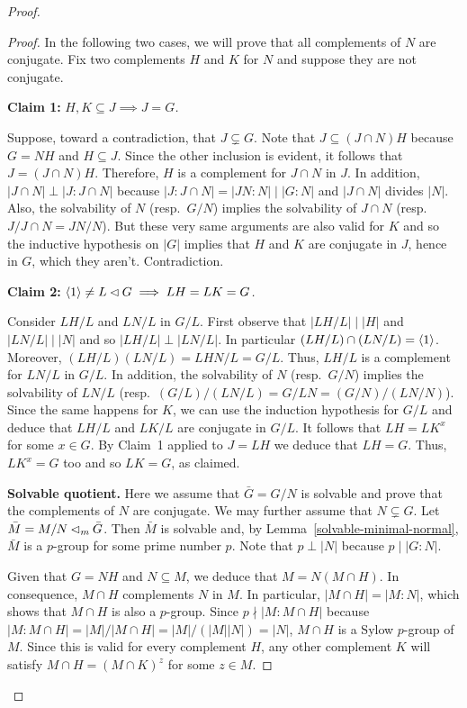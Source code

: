 \begin{solution}
\begin{proof}
\begin{proof}
    In the following two cases, we will prove that all complements of $N$ are conjugate. Fix two complements $H$ and $K$ for $N$ and suppose they are not conjugate.

    \textbf{Claim 1:} \textit{$H,K\subseteq J\implies J=G$.}

    Suppose, toward a contradiction, that $J\varsubsetneq G$. Note that $J\subseteq(J\cap N)H$ because $G=NH$ and $H\subseteq J$. Since the other inclusion is evident, it follows that $J=(J\cap N)H$. Therefore, $H$ is a complement for $J\cap N$ in $J$. In addition, $|J\cap N|\perp|J:J\cap N|$ because $|J:J\cap N|=|JN:N|\mid|G:N|$ and $|J\cap N|$ divides $|N|$. Also, the solvability of $N$ (resp.~$G/N$) implies the solvability of $J\cap N$ (resp.~$J/J\cap N=JN/N$). But these very same arguments are also valid for $K$ and so the inductive hypothesis on $|G|$ implies that $H$ and $K$ are conjugate in $J$, hence in $G$, which they aren't. Contradiction.

    \textbf{Claim 2:} \textit{$\langle1\rangle\ne L\lhd G\implies LH=LK=G$.}

    Consider $LH/L$ and $LN/L$ in $G/L$. First observe that $|LH/L|\mid|H|$ and $|LN/L|\mid|N|$ and so $|LH/L|\perp|LN/L|$. In particular $(LH/L)\cap(LN/L)=\langle1\rangle$. Moreover, $(LH/L)(LN/L)=LHN/L=G/L$. Thus, $LH/L$ is a complement for $LN/L$ in $G/L$. In addition, the solvability of $N$ (resp.~$G/N$) implies the solvability of $LN/L$ (resp.~$(G/L)/(LN/L)=G/LN=(G/N)/(LN/N)$). Since the same happens for $K$, we can use the induction hypothesis for $G/L$ and deduce that $LH/L$ and $LK/L$ are conjugate in $G/L$. It follows that $LH=LK^x$ for some $x\in G$. By Claim~1 applied to $J=LH$ we deduce that $LH=G$. Thus, $LK^x=G$ too and so $LK=G$, as claimed.

    \medskip

    \textbf{Solvable quotient.} Here we assume that $\bar G=G/N$ is solvable and prove that the complements of $N$ are conjugate. We may further assume that $N\varsubsetneq G$. Let $\bar M=M/N\lhd_m\bar G$. Then $\bar M$ is solvable and, by Lemma~\ref{solvable-minimal-normal}, $\bar M$ is a $p$-group for some prime number $p$. Note that $p\perp|N|$ because $p\mid |G:N|$.

    Given that $G=NH$ and $N\subseteq M$, we deduce that $M=N(M\cap H)$. In consequence, $M\cap H$ complements $N$ in $M$. In particular, $|M\cap H|=|M:N|$, which shows that $M\cap H$ is also a $p$-group. Since $p\nmid|M:M\cap H|$ because $|M:M\cap H|=|M|/|M\cap H|=|M|/(|M||N|)=|N|$, $M\cap H$ is a Sylow $p$-group of $M$. Since this is valid for every complement $H$, any other complement $K$ will satisfy $M\cap H=(M\cap K)^z$ for some $z\in M$.
    

\end{proof}
\end{proof}
\end{solution}
